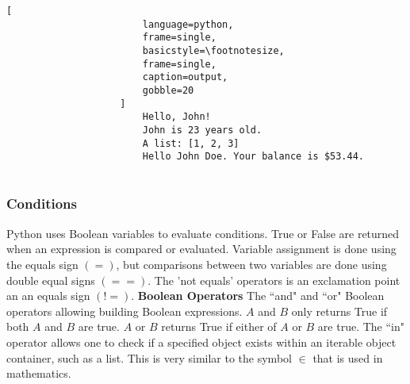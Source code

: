 \documentclass[crop=false,class=book,oneside]{standalone}
\begin{document}
                \begin{minipage}[t]{.48\textwidth}
                    \centering
                    \begin{lstlisting}[
                        language=python,
                        frame=single,
                        basicstyle=\footnotesize,
                        frame=single,
                        caption=output,
                        gobble=20
                    ]
                        Hello, John!
                        John is 23 years old.
                        A list: [1, 2, 3]
                        Hello John Doe. Your balance is $53.44.
    
                    \end{lstlisting}
                \end{minipage}
            \subsubsection{Conditions}
                Python uses Boolean variables to evaluate conditions.
                True or False are returned when an expression is
                compared or evaluated. Variable assignment is done
                using the equals sign $(=)$, but comparisons between
                two variables are done using double equal signs
                $(==)$. The 'not equals' operators is an exclamation
                point an an equals sign $(!=)$.
                \textbf{Boolean Operators}
                    The ``and" and ``or" Boolean operators allowing
                    building Boolean expressions. $A$ and $B$ only
                    returns True if both $A$ and $B$ are true. $A$ or
                    $B$ returns True if either of $A$ or $B$ are
                    true. The ``in" operator allows one to check if a
                    specified object exists within an iterable object
                    container, such as a list. This is very similar
                    to the symbol $\in$ that is used in
                    mathematics.\newline
\end{document}
